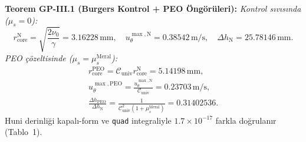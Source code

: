 \documentclass[12pt,a4paper]{article}
\begin{document}
\textbf{Teorem GP-III.1 (Burgers Kontrol + PEO Öngörüleri):} \textit{Kontrol
sıvısında ($\mu_s=0$):}
\begin{equation}
\label{eq:burgers}
\boxed{r_{\mathrm{core}}^{\mathrm{N}}=\sqrt{\frac{2\nu_0}{\gamma}}
=3.16228\,\mathrm{mm},\quad
u_\theta^{\max,\mathrm{N}}=0.38542\,\mathrm{m/s},\quad
\Delta h_{\mathrm{N}}=25.78146\,\mathrm{mm}.}
\end{equation}
\textit{PEO çözeltisinde ($\mu_s=\mu_s^{\mathrm{Meral}}$):}
\begin{equation}
\label{eq:peo}
\begin{split}
\boxed{r_{\mathrm{core}}^{\mathrm{PEO}}=\mathcal{C}_{\mathrm{univ}}r_{\mathrm{core}}^{\mathrm{N}}
=5.14198\,\mathrm{mm},} \\
\boxed{u_\theta^{\max,\mathrm{PEO}}=\frac{u_\theta^{\max,\mathrm{N}}}{\mathcal{C}_{\mathrm{univ}}}
=0.23703\,\mathrm{m/s},} \\
\boxed{\frac{\Delta h_{\mathrm{PEO}}}{\Delta h_{\mathrm{N}}}
=\frac{1}{\mathcal{C}_{\mathrm{univ}}^2(1+\mu_s^{\mathrm{Meral}})}=0.31402536.}
\end{split}
\end{equation}
Huni derinliği kapalı-form ve \texttt{quad} integraliyle $1.7\times 10^{-17}$
farkla doğrulanır (Tablo~1).
\end{document}
